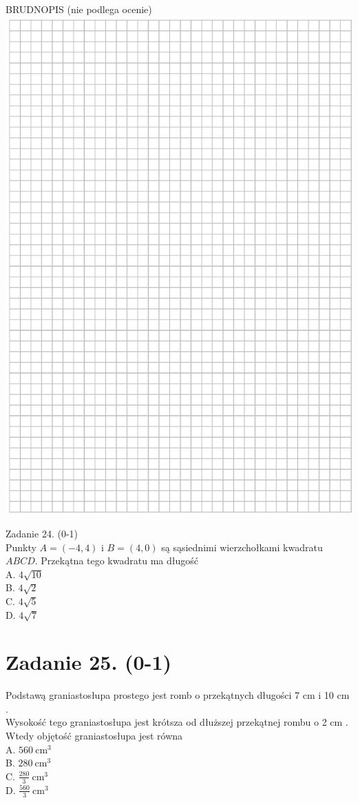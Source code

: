 \documentclass[10pt]{article}
\begin{document}
BRUDNOPIS (nie podlega ocenie)\\
\includegraphics[max width=\textwidth, center]{2024_11_21_465acd0c12fa3e05e8a7g-13}

Zadanie 24. (0-1)\\
Punkty \(A=(-4,4)\) i \(B=(4,0)\) są sąsiednimi wierzchołkami kwadratu \(A B C D\). Przekątna tego kwadratu ma długość\\
A. \(4 \sqrt{10}\)\\
B. \(4 \sqrt{2}\)\\
C. \(4 \sqrt{5}\)\\
D. \(4 \sqrt{7}\)

\section*{Zadanie 25. (0-1)}
Podstawą graniastosłupa prostego jest romb o przekątnych długości 7 cm i 10 cm .\\
Wysokość tego graniastosłupa jest krótsza od dłuższej przekątnej rombu o 2 cm . Wtedy objętość graniastosłupa jest równa\\
A. \(560 \mathrm{~cm}^{3}\)\\
B. \(280 \mathrm{~cm}^{3}\)\\
C. \(\frac{280}{3} \mathrm{~cm}^{3}\)\\
D. \(\frac{560}{3} \mathrm{~cm}^{3}\)
\end{document}
